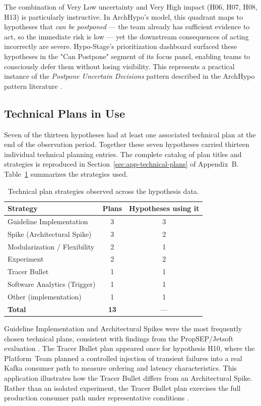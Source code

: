 The combination of Very Low uncertainty and Very High impact (H06, H07, H08,
H13) is particularly instructive. In ArchHypo's model, this quadrant maps to
hypotheses that \textit{can be postponed} — the team already has sufficient
evidence to act, so the immediate risk is low — yet the downstream consequences
of acting incorrectly are severe. Hypo-Stage's prioritization dashboard surfaced
these hypotheses in the "Can Postpone" segment of its focus panel, enabling
teams to consciously defer them without losing visibility. This represents
a practical instance of the \textit{Postpone Uncertain Decisions} pattern
described in the ArchHypo pattern literature \citep{silva2024patterns}.

\subsection{Technical Plans in Use}
\label{subsec:technical-plans}

Seven of the thirteen hypotheses had at least one associated technical plan at
the end of the observation period. Together these seven hypotheses carried thirteen
individual technical planning entries. The complete catalog of plan titles and
strategies is reproduced in Section~\ref{sec:app-technical-plans} of Appendix~B.
Table~\ref{tab:plan-strategies} summarizes
the strategies used.

\begin{table}[htbp]
\caption{Technical plan strategies observed across the hypothesis data.}
\label{tab:plan-strategies}
\centering\small
\begin{tabular}{lcc}
\toprule
\textbf{Strategy} & \textbf{Plans} & \textbf{Hypotheses using it} \\
\midrule
Guideline Implementation & 3 & 3 \\
Spike (Architectural Spike) & 3 & 2 \\
Modularization / Flexibility & 2 & 1 \\
Experiment & 2 & 2 \\
Tracer Bullet & 1 & 1 \\
Software Analytics (Trigger) & 1 & 1 \\
Other (implementation) & 1 & 1 \\
\midrule
\textbf{Total} & \textbf{13} & — \\
\bottomrule
\end{tabular}
\end{table}

Guideline Implementation and Architectural Spikes were the most frequently
chosen technical plans, consistent with findings from the PropSEP/Jetsoft evaluation
\citep{silva2025archhypo}. The Tracer Bullet plan appeared once for hypothesis H10,
where the Platform~Team planned a controlled injection of transient failures into
a real Kafka consumer path to measure ordering and latency characteristics. This
application illustrates how the Tracer Bullet differs from an Architectural Spike. Rather than
an isolated experiment, the Tracer Bullet plan exercises the full production consumer path
under representative conditions \citep{silva2024agilepatterns}.

